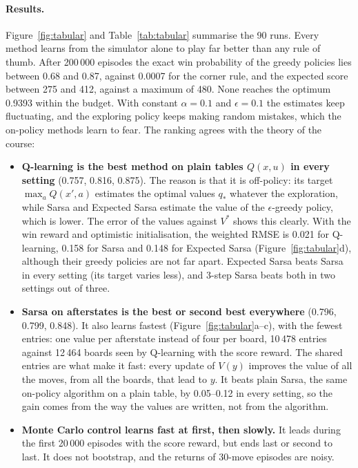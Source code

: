\documentclass[11pt,a4paper]{article}
\theoremstyle{remark}
\begin{document}
\paragraph{Results.} Figure~\ref{fig:tabular} and Table~\ref{tab:tabular} summarise the 90 runs. Every method learns from the simulator alone to play far better than any rule of thumb. After 200\,000 episodes the exact win probability of the greedy policies lies between 0.68 and 0.87, against 0.0007 for the corner rule, and the expected score between 275 and 412, against a maximum of 480. None reaches the optimum 0.9393 within the budget. With constant $\alpha=0.1$ and $\epsilon=0.1$ the estimates keep fluctuating, and the exploring policy keeps making random mistakes, which the on-policy methods learn to fear. The ranking agrees with the theory of the course:
\begin{itemize}[leftmargin=*]
\item \textbf{Q-learning is the best method on plain tables $Q(x,u)$ in every setting} (0.757, 0.816, 0.875). The reason is that it is off-policy: its target $\max_a Q(x',a)$ estimates the optimal values $q_*$ whatever the exploration, while Sarsa and Expected Sarsa estimate the value of the $\epsilon$-greedy policy, which is lower. The error of the values against $V^*$ shows this clearly. With the win reward and optimistic initialisation, the weighted RMSE is 0.021 for Q-learning, 0.158 for Sarsa and 0.148 for Expected Sarsa (Figure~\ref{fig:tabular}d), although their greedy policies are not far apart. Expected Sarsa beats Sarsa in every setting (its target varies less), and 3-step Sarsa beats both in two settings out of three.
\item \textbf{Sarsa on afterstates is the best or second best everywhere} (0.796, 0.799, 0.848). It also learns fastest (Figure~\ref{fig:tabular}a--c), with the fewest entries: one value per afterstate instead of four per board, 10\,478 entries against 12\,464 boards seen by Q-learning with the score reward. The shared entries are what make it fast: every update of $V(y)$ improves the value of all the moves, from all the boards, that lead to $y$. It beats plain Sarsa, the same on-policy algorithm on a plain table, by 0.05--0.12 in every setting, so the gain comes from the way the values are written, not from the algorithm.
\item \textbf{Monte Carlo control learns fast at first, then slowly.} It leads during the first 20\,000 episodes with the score reward, but ends last or second to last. It does not bootstrap, and the returns of 30-move episodes are noisy.

\end{itemize}
\end{document}
